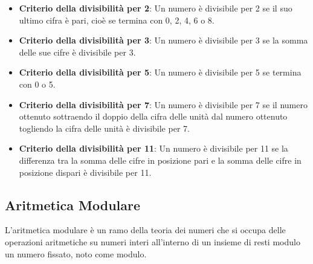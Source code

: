 \documentclass[a4paper,12pt]{report}
\begin{document}
\begin{itemize}
	\item \textbf{Criterio della divisibilità per 2}: Un numero è divisibile per 2 se il suo ultimo cifra è pari, cioè se termina con 0, 2, 4, 6 o 8.
	
	\item \textbf{Criterio della divisibilità per 3}: Un numero è divisibile per 3 se la somma delle sue cifre è divisibile per 3.
	
	\item \textbf{Criterio della divisibilità per 5}: Un numero è divisibile per 5 se termina con 0 o 5.
	
	\item \textbf{Criterio della divisibilità per 7}: Un numero è divisibile per 7 se il numero ottenuto sottraendo il doppio della cifra delle unità dal numero ottenuto togliendo la cifra delle unità è divisibile per 7.

	\item \textbf{Criterio della divisibilità per 11}: Un numero è divisibile per 11 se la differenza tra la somma delle cifre in posizione pari e la somma delle cifre in posizione dispari è divisibile per 11.

\end{itemize}



\subsection*{Aritmetica Modulare}
L'aritmetica modulare è un ramo della teoria dei numeri che si occupa delle operazioni aritmetiche su numeri interi all'interno
di un insieme di resti modulo un numero fissato, noto come modulo. 
\end{document}
